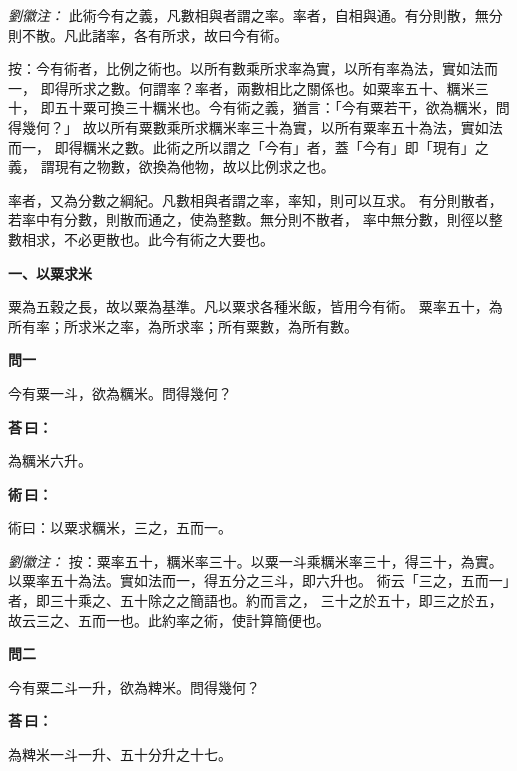 \documentclass[11pt,a4paper]{article}
\newenvironment{problem}[1][]{%
  \par\vspace{0.6em}\noindent\textcolor{problemcolor}{\textbf{問\ignorespaces#1\unskip}\hspace{0.5em}}%
  \ignorespaces
}{\par\vspace{0.4em}}
\newenvironment{answer}{%
  \par\noindent\textcolor{answercolor}{\textbf{荅\,曰：}}%
  \ignorespaces
}{\par\vspace{0.3em}}
\newenvironment{method}{%
  \par\noindent\textcolor{methodcolor}{\textbf{術\,曰：}}%
  \ignorespaces
}{\par\vspace{0.4em}}
\newenvironment{liuhuicomm}{%
  \par\vspace{0.3em}\noindent\textcolor{commentarycolor}{\small\textit{劉徽注：}}}%
  {\par\vspace{0.5em}}
\begin{document}
\begin{liuhuicomm}
此術今有之義，凡數相與者謂之率。率者，自相與通。有分則散，無分則不散。凡此諸率，各有所求，故曰今有術。

按：今有術者，比例之術也。以所有數乘所求率為實，以所有率為法，實如法而一，
即得所求之數。何謂率？率者，兩數相比之關係也。如粟率五十、糲米三十，
即五十粟可換三十糲米也。今有術之義，猶言：「今有粟若干，欲為糲米，問得幾何？」
故以所有粟數乘所求糲米率三十為實，以所有粟率五十為法，實如法而一，
即得糲米之數。此術之所以謂之「今有」者，蓋「今有」即「現有」之義，
謂現有之物數，欲換為他物，故以比例求之也。

率者，又為分數之綱紀。凡數相與者謂之率，率知，則可以互求。
有分則散者，若率中有分數，則散而通之，使為整數。無分則不散者，
率中無分數，則徑以整數相求，不必更散也。此今有術之大要也。
\end{liuhuicomm}

\vspace{0.8em}
\noindent\textbf{\large 一、以粟求米}
\vspace{0.5em}

\noindent 粟為五穀之長，故以粟為基準。凡以粟求各種米飯，皆用今有術。
粟率五十，為所有率；所求米之率，為所求率；所有粟數，為所有數。

\begin{problem}[一]
今有粟一斗，欲為糲米。問得幾何？
\end{problem}

\begin{answer}
為糲米六升。
\end{answer}

\begin{method}
術曰：以粟求糲米，三之，五而一。
\end{method}

\begin{liuhuicomm}
按：粟率五十，糲米率三十。以粟一斗乘糲米率三十，得三十，為實。
以粟率五十為法。實如法而一，得五分之三斗，即六升也。
術云「三之，五而一」者，即三十乘之、五十除之之簡語也。約而言之，
三十之於五十，即三之於五，故云三之、五而一也。此約率之術，使計算簡便也。
\end{liuhuicomm}

\begin{problem}[二]
今有粟二斗一升，欲為粺米。問得幾何？
\end{problem}

\begin{answer}
為粺米一斗一升、五十分升之十七。
\end{answer}
\end{document}
